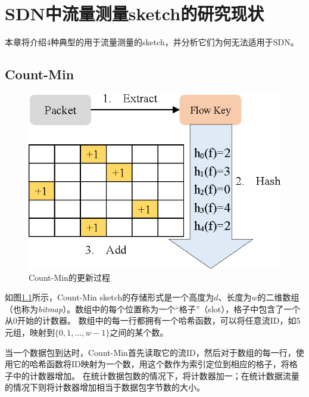 \chapter{SDN中流量测量sketch的研究现状}

本章将介绍4种典型的用于流量测量的sketch，并分析它们为何无法适用于SDN。

\section{Count-Min\cite{cormode2004improved}}

\begin{figure}[h]
	\centering
	\includegraphics[width=0.8\linewidth]{fig/countmin2.eps}
	\caption{Count-Min的更新过程}\label{fig:countmin}
\end{figure}

如图\ref{fig:countmin}所示，Count-Min sketch的存储形式是一个高度为$d$、长度为$w$的二维数组（也称为\textit{bitmap}）。数组中的每个位置称为一个“格子”（slot），格子中包含了一个从0开始的计数器。
数组中的每一行都拥有一个哈希函数，可以将任意流ID，如5元组，映射到$\{0,1,...,w-1\}$之间的某个数。

当一个数据包到达时，Count-Min首先读取它的流ID，然后对于数组的每一行，使用它的哈希函数将ID映射为一个数，用这个数作为索引定位到相应的格子，将格子中的计数器增加。
在统计数据包数的情况下，将计数器加一；在统计数据流量的情况下则将计数器增加相当于数据包字节数的大小。
